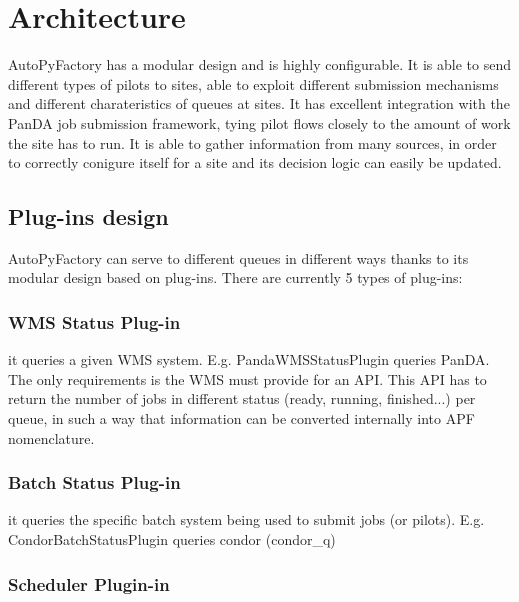 \documentclass[a4paper]{jpconf}
\begin{document}
\subsection{}

\section{Architecture}


AutoPyFactory has a modular design and is highly configurable. 
It is able to send different types of pilots to sites, 
able to exploit different submission mechanisms and different charateristics of queues at sites. 
It has excellent integration with the PanDA job submission framework, 
tying pilot flows closely to the amount of work the site has to run. 
It is able to gather information from many sources, 
in order to correctly conigure itself for a site and its decision logic can easily be updated.

\subsection{Plug-ins design}

AutoPyFactory can serve to different queues in different ways 
thanks to its modular design based on plug-ins. 
There are currently 5 types of plug-ins:

\subsubsection{WMS Status Plug-in} 

it queries a given WMS system. E.g. PandaWMSStatusPlugin queries PanDA. 
The only requirements is the WMS must provide for an API. 
This API has to return the number of jobs in different status (ready, running, finished...) per queue, 
in such a way that information can be converted internally into APF nomenclature. 

\subsubsection{Batch Status Plug-in} 

it queries the specific batch system being used to submit jobs (or pilots). 
E.g. CondorBatchStatusPlugin queries condor (condor\_q)

\subsubsection{Scheduler Plugin-in} 
\end{document}
